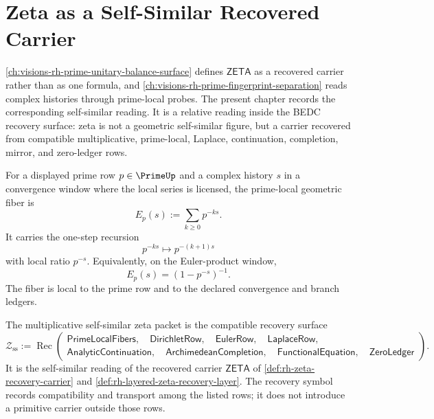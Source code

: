 \chapter{Zeta as a Self-Similar Recovered Carrier}
\label{ch:visions-rh-zeta-self-similar-recovered-carrier}

\autoref{ch:visions-rh-prime-unitary-balance-surface} defines
$\mathsf{ZETA}$ as a recovered carrier rather than as one formula, and
\autoref{ch:visions-rh-prime-fingerprint-separation} reads complex
histories through prime-local probes. The present chapter records the
corresponding self-similar reading. It is a relative reading inside the
BEDC recovery surface: zeta is not a geometric self-similar figure, but
a carrier recovered from compatible multiplicative, prime-local,
Laplace, continuation, completion, mirror, and zero-ledger rows.

\begin{definition}
\label{def:rh-prime-local-geometric-fiber}
For a displayed prime row $p\in\PrimeUp$ and a complex history $s$ in a
convergence window where the local series is licensed, the
prime-local geometric fiber is
$$
E_p(s):=\sum_{k\geq0}p^{-ks}.
$$
It carries the one-step recursion
$$
p^{-ks}\mapsto p^{-(k+1)s}
$$
with local ratio $p^{-s}$. Equivalently, on the Euler-product window,
$$
E_p(s)=(1-p^{-s})^{-1}.
$$
The fiber is local to the prime row and to the declared convergence and
branch ledgers.
\end{definition}

\begin{definition}
\label{def:rh-multiplicative-self-similar-zeta-packet}
The multiplicative self-similar zeta packet is the compatible recovery
surface
$$
\mathcal Z_{\mathrm{ss}}
:=
\operatorname{Rec}
\left(
\begin{gathered}
\mathsf{PrimeLocalFibers},\quad
\mathsf{DirichletRow},\quad
\mathsf{EulerRow},\quad
\mathsf{LaplaceRow},\\
\mathsf{AnalyticContinuation},\quad
\mathsf{ArchimedeanCompletion},\quad
\mathsf{FunctionalEquation},\quad
\mathsf{ZeroLedger}
\end{gathered}
\right).
$$
It is the self-similar reading of the recovered carrier
$\mathsf{ZETA}$ of \autoref{def:rh-zeta-recovery-carrier} and
\autoref{def:rh-layered-zeta-recovery-layer}. The recovery symbol
records compatibility and transport among the listed rows; it does not
introduce a primitive carrier outside those rows.
\end{definition}

